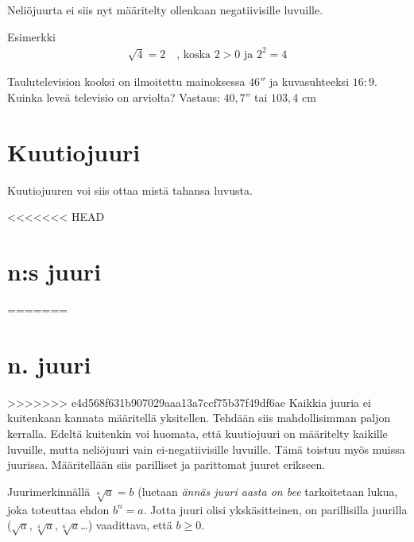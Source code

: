 

Neliöjuurta ei siis nyt määritelty ollenkaan negatiivisille luvuille.


Esimerkki
\begin{align*}
\sqrt{4} = 2\quad \textrm{, koska $2>0$ ja $2^2 =4$} 
\end{align*}

Taulutelevision kooksi on ilmoitettu mainoksessa $46''$ ja kuvasuhteeksi $16:9$. Kuinka leveä televisio on arviolta?
Vastaus: $40,7$'' tai $103,4$ cm

\section{Kuutiojuuri}

Kuutiojuuren voi siis ottaa mistä tahansa luvusta.

<<<<<<< HEAD
\section{n:s juuri}
=======
\section{n. juuri}
>>>>>>> e4d568f631b907029aaa13a7ccf75b37f49df6ae
Kaikkia juuria ei kuitenkaan kannata määritellä yksitellen. Tehdään siis mahdollisimman paljon kerralla. Edeltä kuitenkin voi huomata, että kuutiojuuri on määritelty kaikille luvuille, mutta neliöjuuri vain ei-negatiivisille luvuille. Tämä toistuu myös muissa juurissa. Määritellään siis parilliset ja parittomat juuret erikseen.

Juurimerkinnällä $\sqrt[n]{a}=b$ (luetaan \emph{ännäs juuri aasta on bee} tarkoitetaan lukua, joka toteuttaa ehdon $b^n = a$. Jotta juuri olisi ykskäsitteinen, on parillisilla juurilla ($\sqrt{a}, \sqrt[4]{a}, \sqrt[6]{a}$\ldots) vaadittava, että $b\ge0$.

